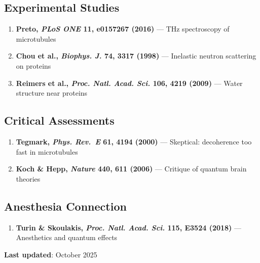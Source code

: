 \subsection{Experimental Studies}\label{experimental-studies}

\begin{enumerate}
\def\labelenumi{\arabic{enumi}.}
\setcounter{enumi}{3}

\item
  \textbf{Preto, \emph{PLoS ONE} 11, e0157267 (2016)} --- THz
  spectroscopy of microtubules
\item
  \textbf{Chou et al., \emph{Biophys. J.} 74, 3317 (1998)} ---
  Inelastic neutron scattering on proteins
\item
  \textbf{Reimers et al., \emph{Proc. Natl. Acad. Sci.} 106, 4219
  (2009)} --- Water structure near proteins
\end{enumerate}

\subsection{Critical Assessments}\label{critical-assessments}

\begin{enumerate}
\def\labelenumi{\arabic{enumi}.}
\setcounter{enumi}{6}

\item
  \textbf{Tegmark, \emph{Phys. Rev.~E} 61, 4194 (2000)} ---
  Skeptical: decoherence too fast in microtubules
\item
  \textbf{Koch \& Hepp, \emph{Nature} 440, 611 (2006)} --- Critique
  of quantum brain theories
\end{enumerate}

\subsection{Anesthesia Connection}\label{anesthesia-connection}

\begin{enumerate}
\def\labelenumi{\arabic{enumi}.}
\setcounter{enumi}{8}

\item
  \textbf{Turin \& Skoulakis, \emph{Proc. Natl. Acad. Sci.} 115, E3524
  (2018)} --- Anesthetics and quantum effects
\end{enumerate}



\textbf{Last updated}: October 2025
